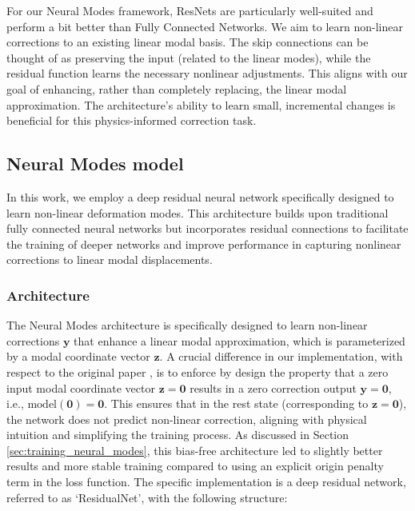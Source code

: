 For our Neural Modes framework, ResNets are particularly well-suited and perform a bit better than Fully Connected Networks. We aim to learn non-linear corrections to an existing linear modal basis. The skip connections can be thought of as preserving the input (related to the linear modes), while the residual function learns the necessary nonlinear adjustments. This aligns with our goal of enhancing, rather than completely replacing, the linear modal approximation. The architecture's ability to learn small, incremental changes is beneficial for this physics-informed correction task. 





\subsection{Neural Modes model}
In this work, we employ a deep residual neural network specifically designed to learn non-linear deformation modes. This architecture builds upon traditional fully connected neural networks but incorporates residual connections to facilitate the training of deeper networks and improve performance in capturing nonlinear corrections to linear modal displacements.


\subsubsection{Architecture}
\label{sec:neural_modes_arch}
The Neural Modes architecture is specifically designed to learn non-linear corrections \( \bm{y} \) that enhance a linear modal approximation, which is parameterized by a modal coordinate vector \( \mathbf{z} \). A crucial difference in our implementation, with respect to the original paper \cite{Wang_Du_Coros_Thomaszewski_2024}, is to enforce by design the property that a zero input modal coordinate vector \( \mathbf{z}=\bm{0} \) results in a zero correction output \( \bm{y}=\bm{0} \), i.e., \( \text{model}(\bm{0}) = \bm{0} \). This ensures that in the rest state (corresponding to \( \mathbf{z}=\bm{0} \)), the network does not predict non-linear correction, aligning with physical intuition and simplifying the training process. As discussed in Section \ref{sec:training_neural_modes}, this bias-free architecture led to slightly better results and more stable training compared to using an explicit origin penalty term in the loss function. The specific implementation is a deep residual network, referred to as `ResidualNet', with the following structure:

